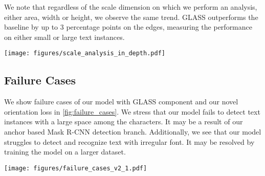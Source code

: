 \documentclass[runningheads]{llncs}
\begin{document}
We note that regardless of the scale dimension on which we perform an analysis, either area, width or height, we observe the same trend.
GLASS outperforms the baseline by up to 3 percentage points on the edges, measuring the performance on either small or large text instances.

\begin{figure*}[t]
 \centering
  \texttt{[image: figures/scale\_analysis\_in\_depth.pdf]}
   \caption{\textbf{In-depth performance analysis for different scales.} Different text instances are over four different size groups S, M, L and XL. 
   We analyze end-to-end recognition performance for 3 different text scale dimensions: (a) Polygon area, (b) Rotated bounding box width and (c) Rotated bounding box height.
   For all different scale properties, GLASS increases performance over the baseline, especially on the extremities of small and large text.
   }
  \label{fig:scale_analysis_supp}
\end{figure*}






\subsection{Failure Cases}
We show failure cases of our model with GLASS component and our novel orientation loss in \cref{fig:failure_cases}. 
We stress that our model fails to detect text instances with a large space among the characters. 
It may be a result of  our anchor based Mask R-CNN detection branch.
Additionally, we see that our model struggles to detect and recognize text with irregular font.
It may be resolved by training the model on a larger dataset.
\begin{figure*}[t]
 \centering
  \texttt{[image: figures/failure\_cases\_v2\_1.pdf]}
   \caption{\textbf{Failure cases of our model with GLASS component on the Total-Text dataset.} In the upper images, we see that our model fails to detect text instances with a large space among the characters. In the second row of images, our model struggles to detect and recognize text with irregular font. 
  }
  \label{fig:failure_cases}
\end{figure*}

 
\end{document}
